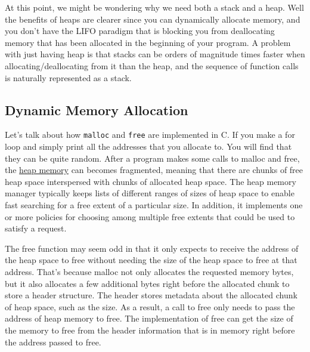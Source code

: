 \documentclass{article}
\newcounter{definition}[section]
\begin{document}
    \begin{definition}
      \label{def:dangling-pointer}
      
    \end{definition}

    At this point, we might be wondering why we need both a stack and a heap. Well the benefits of heaps are clearer since you can dynamically allocate memory, and you don't have the LIFO paradigm that is blocking you from deallocating memory that has been allocated in the beginning of your program. A problem with just having heap is that stacks can be orders of magnitude times faster when allocating/deallocating from it than the heap, and the sequence of function calls is naturally represented as a stack. 

  \subsection{Dynamic Memory Allocation}

    Let's talk about how \texttt{malloc} and \texttt{free} are implemented in C. If you make a for loop and simply print all the addresses that you allocate to. You will find that they can be quite random. After a program makes some calls to malloc and free, the \hyperref[def:heap-memory]{heap memory} can becomes fragmented, meaning that there are chunks of free heap space interspersed with chunks of allocated heap space. The heap memory manager typically keeps lists of different ranges of sizes of heap space to enable fast searching for a free extent of a particular size. In addition, it implements one or more policies for choosing among multiple free extents that could be used to satisfy a request.

    The free function may seem odd in that it only expects to receive the address of the heap space to free without needing the size of the heap space to free at that address. That’s because malloc not only allocates the requested memory bytes, but it also allocates a few additional bytes right before the allocated chunk to store a header structure. The header stores metadata about the allocated chunk of heap space, such as the size. As a result, a call to free only needs to pass the address of heap memory to free. The implementation of free can get the size of the memory to free from the header information that is in memory right before the address passed to free.
\end{document}
